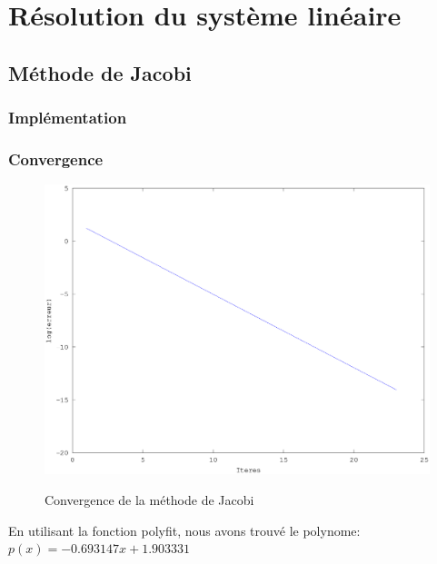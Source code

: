 \documentclass[a4paper,11pt]{article}
\begin{document}
\titleTMB 
\newpage
\tableofcontents
\newpage

\section{Résolution du système linéaire}

\subsection{Méthode de Jacobi}
\subsubsection{Implémentation}

\begin{multicols}{2}
  
\end{multicols}

\newpage
\subsubsection{Convergence}
\begin{figure}[h!]
  \begin{centering}
    \includegraphics[scale=0.5]{../jacobi_graph}
    \label{rspro2}
    \par\end{centering}
  \caption{Convergence de la méthode de Jacobi}
  \label{fig:jacobi-conv}
\end{figure}

En utilisant la fonction polyfit, nous avons trouvé le polynome: 
$p(x)= -0.693147 x + 1.903331 $
\end{document}
